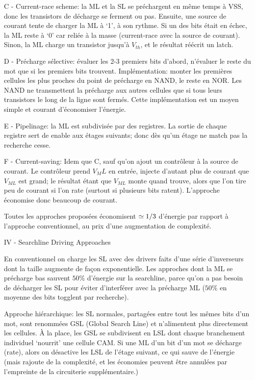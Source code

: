C - Current-race scheme: la ML et la SL se préchargent en même temps à VSS, donc les transistors de décharge se ferment ou pas. Ensuite, une source de courant tente de charger la ML à `1', à son rythme. Si un des bits était en échec, la ML reste à `0' car reliée à la masse (current-race avec la source de courant). Sinon, la ML charge un transistor jusqu'à $V_{th}$, et le résultat réécrit un latch.

D - Précharge sélective: évaluer les 2-3 premiers bits d'abord, n'évaluer le reste du mot que si les premiers bits trouvent. Implémentation: monter les premières cellules les plus proches du point de précharge en NAND, le reste en NOR. Les NAND ne transmettent la précharge aux autres cellules que si tous leurs transistors le long de la ligne sont fermés. Cette implémentation est un moyen simple et courant d'économiser l'énergie.

E - Pipelinage: la ML est subdivisée par des registres. La sortie de chaque registre sert de enable aux étages suivants; donc dès qu'un étage ne match pas la recherche cesse.

F - Current-saving: Idem que C, sauf qu'on ajout un contrôleur à la source de courant. Le contrôleur prend $V_ML$ en entrée, injecte d'autant plus de courant que $V_{ML}$ est grand; le résultat étant que $V_{ML}$ monte quand trouve, alors que l'on tire peu de courant si l'on rate (surtout si plusieurs bits ratent). L'approche économise donc beaucoup de courant.

Toutes les approches proposées économisent $\simeq 1/3$ d'énergie par rapport à l'approche conventionnel, au prix d'une augmentation de complexité.

IV - Searchline Driving Approaches

En conventionnel on charge les SL avec des drivers faits d'une série d'inverseurs dont la taille augmente de façon exponentielle. Les approches dont la ML se précharge bas sauvent $50\%$ d'énergie sur la searchline, parce qu'on a pas besoin de décharger les SL pour éviter d'interférer avec la précharge ML ($50\%$ en moyenne des bits togglent par recherche).

Approche hiérarchique: les SL normales, partagées entre tout les mêmes bits d'un mot, sont renommées GSL (Global Search Line) et n'alimentent plus directement les cellules. À la place, les GSL se subdivisent en LSL dont chaque branchement individuel `nourrit' une cellule CAM. Si une ML d'un bit d'un mot se décharge (rate), alors on désactive les LSL de l'étage suivant, ce qui sauve de l'énergie (mais rajoute de la complexité, et les économies peuvent être annulées par l'empreinte de la circuiterie supplémentaire.)


